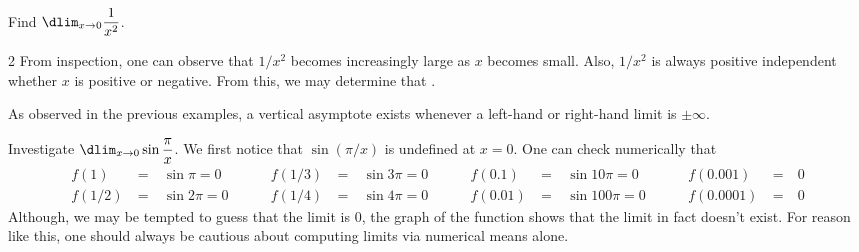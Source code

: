 \documentclass{book}
\begin{document}
\begin{Exam} Find $\dlim_{x\to 0} \dfrac{1}{x^2}$. 
\begin{multicols}{2}
From inspection, one can observe that $1/x^2$ becomes increasingly large as $x$ becomes small. Also, $1/x^2$ is always positive independent whether $x$ is positive or negative. From this, we may determine that . 

\begin{center}
\end{center}
\end{multicols}
\end{Exam}\vs

 As observed in the previous examples, a vertical asymptote exists whenever a left-hand or right-hand limit  is $\pm\infty$.

\begin{Exam} Investigate $\dlim_{x\to 0} \sin \dfrac{\pi}{x}$.
We first notice that $\sin(\pi/x)$ is undefined at $x=0$. One can check numerically that 
\[\begin{alignedat}{100}
f(1)\ &=\ & \sin \pi = 0\ &\qquad f\left(1/3\right)\ &=\ & \sin 3\pi = 0\ &\qquad f\left(0.1\right)\ &=\ & \sin 10\pi = 0\ &\qquad f(0.001)\ &=\ & 0\\
f\left(1/2\right)\ &=\ &  \sin 2\pi = 0\ &\qquad f\left(1/4\right)\ &=\ & \sin 4\pi = 0\ &\qquad f(0.01)\ &=\ & \sin 100 \pi = 0\ &\qquad f(0.0001)\ &=\ & 0
\end{alignedat}\] 
 Although, we may be tempted to guess that the limit is 0, the graph of the function shows that the limit in fact doesn't exist. For reason like this, one should always be cautious about computing limits via numerical means alone.

\begin{center}
\end{center}
\end{Exam}
\end{document}
